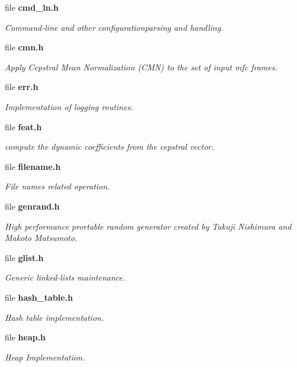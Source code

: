 \begin{DoxyCompactItemize}
file \textbf{ cmd\+\_\+ln.\+h}
\begin{DoxyCompactList}\small\item\em Command-\/line and other configurationparsing and handling. \end{DoxyCompactList}\item 
file \textbf{ cmn.\+h}
\begin{DoxyCompactList}\small\item\em Apply Cepstral Mean Normalization (C\+MN) to the set of input mfc frames. \end{DoxyCompactList}\item 
file \textbf{ err.\+h}
\begin{DoxyCompactList}\small\item\em Implementation of logging routines. \end{DoxyCompactList}\item 
file \textbf{ feat.\+h}
\begin{DoxyCompactList}\small\item\em compute the dynamic coefficients from the cepstral vector. \end{DoxyCompactList}\item 
file \textbf{ filename.\+h}
\begin{DoxyCompactList}\small\item\em File names related operation. \end{DoxyCompactList}\item 
file \textbf{ genrand.\+h}
\begin{DoxyCompactList}\small\item\em High performance prortable random generator created by Takuji Nishimura and Makoto Matsumoto. \end{DoxyCompactList}\item 
file \textbf{ glist.\+h}
\begin{DoxyCompactList}\small\item\em Generic linked-\/lists maintenance. \end{DoxyCompactList}\item 
file \textbf{ hash\+\_\+table.\+h}
\begin{DoxyCompactList}\small\item\em Hash table implementation. \end{DoxyCompactList}\item 
file \textbf{ heap.\+h}
\begin{DoxyCompactList}\small\item\em Heap Implementation. \end{DoxyCompactList}\item 

\end{DoxyCompactItemize}
